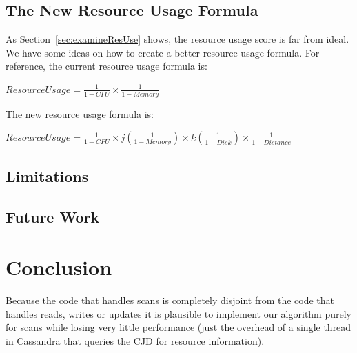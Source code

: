 \subsection{The New Resource Usage Formula}
As Section~\ref{sec:examineResUse} shows, the resource usage score is far from ideal. We have some ideas on how to create a better resource usage formula. For reference, the current resource usage formula is:

\begin{center}
$ResourceUsage = \frac{1}{1-CPU} \times \frac{1}{1-Memory}$
\end{center}

The new resource usage formula is:
\begin{center}
$ResourceUsage = \frac{1}{1-CPU} \times j\left ( \frac{1}{1-Memory} \right ) \times k\left ( \frac{1}{1-Disk} \right ) \times \frac{1}{1-Distance}$
\end{center}



\subsection{Limitations}

\subsection{Future Work}

\section{Conclusion}
Because the code that handles scans is completely disjoint from the code that handles reads, writes or updates it is plausible to implement our algorithm purely for scans while losing very little performance (just the overhead of a single thread in Cassandra that queries the CJD for resource information).
